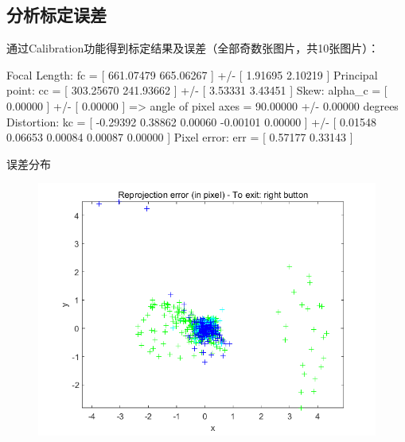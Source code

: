 \documentclass[12pt, a4paper, oneside]{ctexart}
\numberwithin{equation}{section}  %
\begin{document}
\subsection{分析标定误差}
通过Calibration功能得到标定结果及误差（全部奇数张图片，共10张图片）：
\begin{matlabcode}
Focal Length: fc = [ 661.07479   665.06267 ] +/- [ 1.91695   2.10219 ]
Principal point: cc = [ 303.25670   241.93662 ] +/- [ 3.53331   3.43451 ]
Skew: alpha_c = [ 0.00000 ] +/- [ 0.00000  ]   => angle of pixel axes = 90.00000 +/- 0.00000 degrees
Distortion: kc = [ -0.29392   0.38862   0.00060   -0.00101  0.00000 ] +/- [ 0.01548   0.06653   0.00084   0.00087  0.00000 ]
Pixel error: err = [ 0.57177   0.33143 ]
\end{matlabcode}
误差分布
\begin{figure}[htbp]
    \centering
    \includegraphics[scale=0.5]{error.png}
\end{figure}
\end{document}
